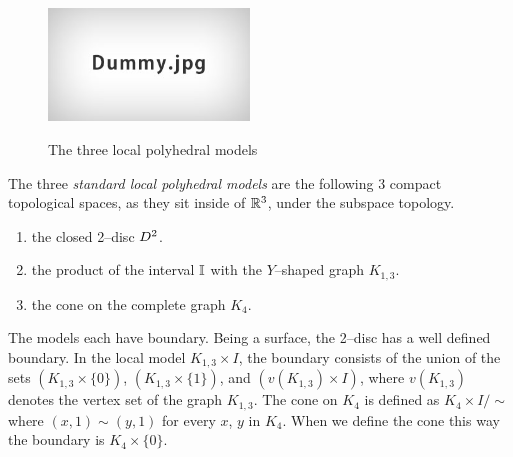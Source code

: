 												\begin{defn}
													\begin{figure}
														\centering
														\caption{The three local polyhedral models}
														\includegraphics[height=3cm]{figures/dummy.jpg}
														\label{fig:localpoly}
													\end{figure}
													The three \emph{standard local polyhedral models} are the following 3 compact topological spaces, as they sit inside of $\mathbb{R}^3$, under the subspace topology.
													\begin{enumerate}
														\item the closed 2--disc $D^2$.
														\item the product of the interval $\mathbb{I}$ with the $Y$--shaped graph $K_{1,3}$.
														\item the cone on the complete graph $K_4$.
													\end{enumerate}
													The models each have boundary.
													Being a surface, the 2--disc has a well defined boundary.
													In the local model $K_{1,3}\times I$, the boundary consists of the union of the sets $(K_{1,3}\times \{0\})$, $(K_{1,3}\times \{1\})$, and $(v(K_{1,3})\times I)$, where $v(K_{1,3})$ denotes the vertex set of the graph $K_{1,3}$.
													The cone on $K_4$ is defined as $K_4\times I /\sim$ where $(x,1)\sim (y,1)$ for every $x$, $y$ in $K_4$.
													When we define the cone this way the boundary is $K_4\times \{0\}$.
												\end{defn}
												
